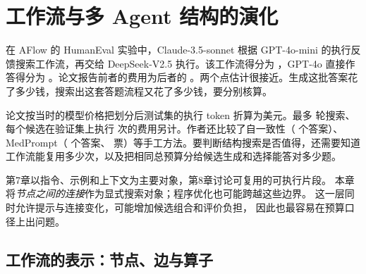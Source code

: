 \chapter{工作流与多 Agent 结构的演化}
\label{ch09}


\begin{failurebox}
在 AFlow 的 HumanEval 实验中，Claude-3.5-sonnet 根据 GPT-4o-mini 的执行反馈搜索工作流，再交给 DeepSeek-V2.5 执行。该工作流得分为 ，GPT-4o 直接作答得分为 。论文报告前者的费用为后者的 \cite{aflow-2410}。两个点估计很接近。生成这批答案花了多少钱，搜索出这套答题流程又花了多少钱，要分别核算。

论文按当时的模型价格把划分后测试集的执行 token 折算为美元。最多  轮搜索、每个候选在验证集上执行  次的费用另计。作者还比较了自一致性（ 个答案）、MedPrompt（ 个答案、 票）等手工方法\cite{aflow-2410}。要判断结构搜索是否值得，还需要知道工作流能复用多少次，以及把相同总预算分给候选生成和选择能答对多少题。

\end{failurebox}


第7章以指令、示例和上下文为主要对象，第8章讨论可复用的可执行片段。
本章将\emph{节点之间的连接}作为显式搜索对象；程序优化也可能跨越这些边界。
这一层同时允许提示与连接变化，可能增加候选组合和评价负担，
因此也最容易在预算口径上出问题。

\section{工作流的表示：节点、边与算子}
\label{sec:ch09-repr}

